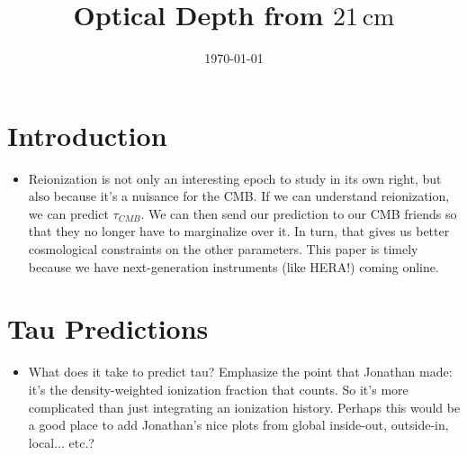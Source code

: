 \documentclass[twocolumn,aps,prd,nofootinbib,showpacs]{revtex4-1}
\begin{document}
\title{Optical Depth from $21\,\textrm{cm}$}


\date{\today}





\begin{abstract}

\end{abstract}

\maketitle

\section{Introduction}
\begin{itemize}
\item Reionization is not only an interesting epoch to study in its own right, but also because it's a nuisance for the CMB.  If we can understand reionization, we can predict $\tau_{CMB}$.  We can then send our prediction to our CMB friends so that they no longer have to marginalize over it.  In turn, that gives us better cosmological constraints on the other parameters.  This paper is timely because we have next-generation instruments (like HERA!) coming online.
\end{itemize}


\section{Tau Predictions}
\begin{itemize}
\item What does it take to predict tau? Emphasize the point that Jonathan made: it's the density-weighted ionization fraction that counts. So it's more complicated than just integrating an ionization history. Perhaps this would be a good place to add Jonathan's nice plots from global inside-out, outside-in, local... etc.?
\end{itemize}
\end{document}
